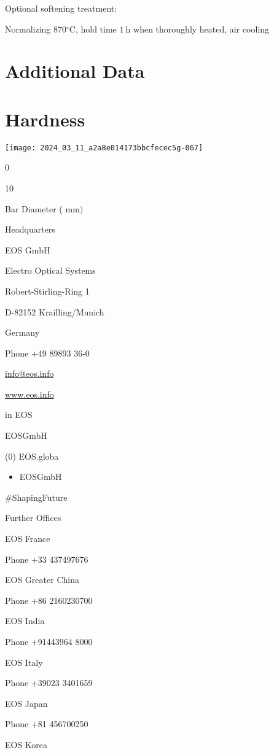 \documentclass[10pt]{article}
\begin{document}
Optional softening treatment:

Normalizing $870{ }^{\circ} \mathrm{C}$, hold time $1 \mathrm{~h}$ when thoroughly heated, air cooling

\section*{Additional Data}
\section*{Hardness}
\begin{center}
\texttt{[image: 2024\_03\_11\_a2a8e014173bbcfecec5g-067]}
\end{center}

0

10

Bar Diameter ( $\mathrm{mm})$

Headquarters

EOS GmbH

Electro Optical Systems

Robert-Stirling-Ring 1

D-82152 Krailling/Munich

Germany

Phone +49 89893 36-0

\href{mailto:info@eos.info}{info@eos.info}

\href{http://www.eos.info}{www.eos.info}

in EOS

EOSGmbH

(0) EOS.globa

\begin{itemize}
  \item EOSGmbH
\end{itemize}

\#ShapingFuture

Further Offices

EOS France

Phone +33 437497676

EOS Greater China

Phone +86 2160230700

EOS India

Phone +91443964 8000

EOS Italy

Phone +39023 3401659

EOS Japan

Phone +81 456700250

EOS Korea
\end{document}
